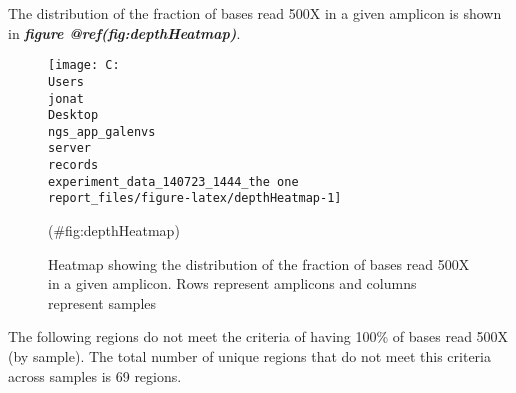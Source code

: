 \documentclass[
]{article}
\begin{document}
The distribution of the fraction of bases read 500X in a given amplicon is shown in \textbf{\emph{figure @ref(fig:depthHeatmap)}}.

\begin{figure}
\texttt{[image: C:\\Users\\jonat\\Desktop\\ngs\_app\_galenvs\\server\\records\\experiment\_data\_140723\_1444\_the one\\report\_files/figure-latex/depthHeatmap-1]} \caption[Depth 500X Heatmap]{Heatmap showing the distribution of the fraction of bases read 500X in a given amplicon. Rows represent amplicons and columns represent samples}(\#fig:depthHeatmap)
\end{figure}

The following regions do not meet the criteria of having 100\% of bases read 500X (by sample). The total number of unique regions that do not meet this criteria across samples is 69 regions.
\end{document}
